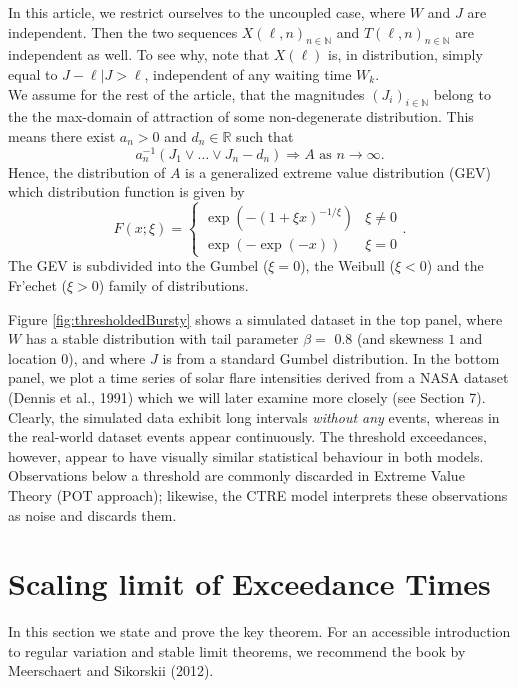 \documentclass[]{elsarticle} %
\begin{document}
In this article, we restrict ourselves to the uncoupled case, where
\(W\) and \(J\) are independent. Then the two sequences
\(X(\ell, n)_{n \in \mathbb N}\) and \(T(\ell, n)_{n \in \mathbb N}\)
are independent as well. To see why, note that \(X(\ell)\) is, in
distribution, simply equal to \(J - \ell | J > \ell\), independent of
any waiting time \(W_k\).\\
We assume for the rest of the article, that the magnitudes
\((J_i)_{i \in \mathbb{N}}\) belong to the the max-domain of attraction
of some non-degenerate distribution. This means there exist \(a_n>0\)
and \(d_n \in \mathbb{R}\) such that
\[ a_n^{-1}(J_1 \vee \ldots \vee J_n -d_n) \Rightarrow A \text{ as } n \rightarrow \infty.\]
Hence, the distribution of \(A\) is a generalized extreme value
distribution (GEV) which distribution function is given by
\[ F(x;\xi) = \begin{cases}\exp(-(1+\xi x)^{-1/\xi}) & \xi\neq0 \\ \exp(-\exp(-x)) & \xi = 0\end{cases}.\]
The GEV is subdivided into the Gumbel (\(\xi=0\)), the Weibull
(\(\xi<0\)) and the Fr'echet (\(\xi>0\)) family of distributions.

Figure \ref{fig:thresholdedBursty} shows a simulated dataset in the top
panel, where \(W\) has a stable distribution with tail parameter
\(\beta =\) 0.8 (and skewness \(1\) and location \(0\)), and where \(J\)
is from a standard Gumbel distribution. In the bottom panel, we plot a
time series of solar flare intensities derived from a NASA dataset
(Dennis et al., 1991) which we will later examine more closely (see
Section 7). Clearly, the simulated data exhibit long intervals
\emph{without any} events, whereas in the real-world dataset events
appear continuously. The threshold exceedances, however, appear to have
visually similar statistical behaviour in both models. Observations
below a threshold are commonly discarded in Extreme Value Theory (POT
approach); likewise, the CTRE model interprets these observations as
noise and discards them.

\hypertarget{sec:scaling}{%
\section{Scaling limit of Exceedance Times}\label{sec:scaling}}

In this section we state and prove the key theorem. For an accessible
introduction to regular variation and stable limit theorems, we
recommend the book by Meerschaert and Sikorskii (2012).
\end{document}
